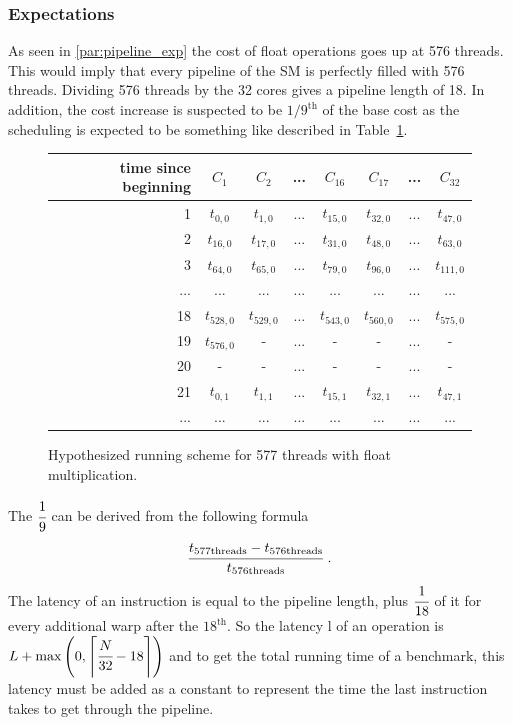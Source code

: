 \documentclass{report}
\begin{document}
	\subsubsection{Expectations}
	As seen in \ref{par:pipeline_exp} the cost of float
    operations goes up at 576 threads. This would imply that every pipeline of
    the SM is perfectly filled with 576 threads. Dividing 576 threads by
    the 32 cores gives a pipeline length of 18. In addition, the cost increase
    is suspected to be $1/9^\text{th}$ of the base cost as the scheduling is expected to be
    something like described in Table~\ref{fig:fp_prediction_513}.
    
    \begin{figure}[H]
      \centering
       \begin{tabular}{ | r || c | c | c | c || c | c | c | }
    	    \hline
    	    time since beginning & $C_1$ & $C_2$ & ... & $C_{16}$ & $C_{17}$ & ... & $C_{32}$ \\ \hline  \hline
    	   1 & $t_{0,0}$ & $t_{1,0}$ & ... & $t_{15,0}$ & $t_{32, 0}$ & ... & $t_{47, 0}$ \\ \hline 
    	   2 & $t_{16,0}$ & $t_{17,0}$ & ... & $t_{31,0}$ & $t_{48, 0}$ & ... & $t_{63, 0}$ \\ \hline
    	   3 & $t_{64,0}$ & $t_{65,0}$ & ... & $t_{79,0}$ & $t_{96, 0}$ & ... & $t_{111, 0}$ \\ \hline
    	   ... & ... & ... & ... & ... & ... & ... & ... \\ \hline
    	   18 & $t_{528,0}$ & $t_{529,0}$ & ... & $t_{543,0}$ & $t_{560,0}$ & ... & $t_{575, 0}$ \\ \hline
    	   19 & $t_{576,0}$ & - & ... & - & - & ... & - \\ \hline
    	   20 & - & - & ... & - & - & ... & - \\ \hline
    	   21 & $t_{0,1}$ & $t_{1,1}$ & ... & $t_{15,1}$ & $t_{32,1}$ & ... & $t_{47,1}$ \\ \hline
    	   ... & ... & ... & ... & ... & ... & ... & ... \\ \hline
  	\end{tabular}
  	\captionsetup{justification=centering}
  	\caption{Hypothesized running scheme for 577 threads with float multiplication.}
  	\label{fig:fp_prediction_513}
   \end{figure}

    The $\cfrac{1}{9}$ can be derived from the following formula
    \[ \cfrac{t_{\text{577threads}} - t_{\text{576threads}}}{t_{\text{576threads}}} \text{  .}\]
    The latency of an instruction is equal to the pipeline length, plus $\cfrac{1}{18}$ of
    it for every additional warp after the $18^{\text{th}}$. So the latency l of an 
    operation is $L + \text{max}\left(0, \left\lceil{\cfrac{N}{32} -18}\right\rceil\right)$ and to get the total
    running time of a benchmark, this latency must be added as a constant to
    represent the time the last instruction takes to get through the pipeline.
\end{document}
